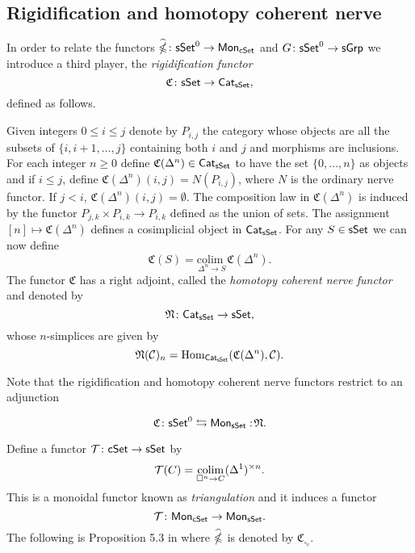 \subsection{Rigidification and homotopy coherent nerve}

In order to relate the functors $\widehat{\operatorname{\mathbb{\Omega}}} \colon \mathsf{sSet}^0 \to \mathsf{Mon}_{\mathsf{cSet}}$ and $G \colon \mathsf{sSet}^0\to \mathsf{sGrp}$ we introduce a third player, the \textit{rigidification functor} $$\mathfrak{C} \colon \mathsf{sSet} \to \mathsf{Cat}_{\mathsf{sSet}}, $$ defined as follows.



Given integers $0 \leq  i \leq j$ denote by $P_{i,j}$ the category whose objects are all the subsets of $\{i, i+1, \dots, j\}$ containing both $i$ and $j$ and morphisms are inclusions.
For each integer $n \geq 0$ define $\mathfrak{C}(\Delta^n) \in \mathsf{Cat}_{\mathsf{sSet}}$ to have the set $\{0, \dots, n\}$ as objects and if $i \leq j$, define $\mathfrak{C}(\Delta^n)(i,j)= N(P_{i,j})$, where $N$ is the ordinary nerve functor.
If $j < i$, $\mathfrak{C}(\Delta^n)(i,j) = \emptyset.$ The composition law in $\mathfrak{C}(\Delta^n)$ is induced by the functor $P_{j,k} \times P_{i,k} \to P_{i,k}$ defined as the union of sets.
The assignment $[n] \mapsto \mathfrak{C}(\Delta^n)$ defines a cosimplicial object in $\mathsf{Cat}_{\mathsf{sSet}}$.
For any $S \in \mathsf{sSet}$ we can now define
 $$\mathfrak{C}(S) = \underset{{\Delta^n \to S} }{\text{colim }} \mathfrak{C}(\Delta^n).$$
The functor $\mathfrak{C}$ has a right adjoint, called the \textit{homotopy coherent nerve functor} and denoted by
$$\mathfrak{N} \colon \mathsf{Cat}_{\mathsf{sSet}} \to \mathsf{sSet},$$ whose $n$-simplices are given by 
$$\mathfrak{N}(\mathcal{C})_n=\text{Hom}_{\mathsf{Cat}_{\mathsf{sSet}}}(\mathfrak{C}(\Delta^n), \mathcal{C}).$$

Note that the rigidification and homotopy coherent nerve functors restrict to an adjunction

$$ \mathfrak{C} \colon \mathsf{sSet}^0 \leftrightarrows \mathsf{Mon}_{\mathsf{sSet}} :\! \mathfrak{N}.$$

Define a functor $\mathcal{T} \colon \mathsf{cSet} \to \mathsf{sSet}$ by $$\mathcal{T}(C) = \operatorname*{colim}_{\square^n \to C} (\Delta^1)^{\times n}.$$
This is a monoidal functor known as \textit{triangulation} and it induces a functor $$\mathcal{T} \colon \mathsf{Mon}_{\mathsf{cSet}} \to \mathsf{Mon}_{\mathsf{sSet}}.$$
The following is Proposition 5.3 in \cite{rivera2018cubical} where $\widehat{\operatorname{\mathbb{\Omega}}}$ is denoted by $\mathfrak{C}_{\square_c}.$

